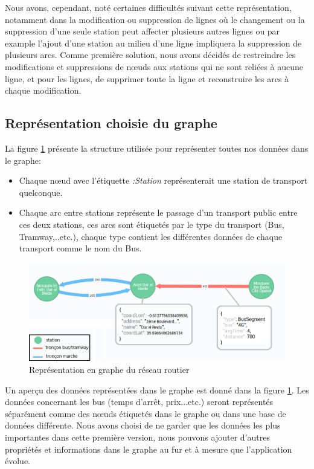 \begin{itemize}
	Nous avons, cependant, noté certaines difficultés suivant cette représentation, notamment dans la modification ou suppression de lignes où le changement ou la suppression d'une seule station peut affecter plusieurs autres lignes ou par example l'ajout d'une station au milieu d'une ligne impliquera la suppression de plusieurs arcs.
	Comme première solution, nous avons décidés de restreindre les modifications et suppressions de nœuds aux stations qui ne sont reliées à aucune ligne, et pour les lignes, de supprimer toute la ligne et reconstruire les arcs à chaque modification.
	     
\end{itemize}
\subsection{Représentation choisie du graphe}
La figure \ref{fig:structGraph} présente la structure utilisée pour représenter toutes nos données dans le graphe:
\begin{itemize}
	\item Chaque nœud avec l'étiquette \emph{:Station} représenterait une station de transport quelconque.
	\item Chaque arc entre stations représente le passage d'un transport public entre ces deux stations, ces arcs sont étiquetés par le type du transport (Bus, Tramway,..etc.), chaque type contient les différentes données de chaque transport comme le nom du Bus.
\end{itemize}

\begin{figure}[h!]
	\center
	\includegraphics[width=\textwidth]{img/structureGraphe.png}
	\caption{Représentation en graphe du réseau routier}
	\label{fig:structGraph}
\end{figure}

Un aperçu des données représentées dans le graphe est donné dans la figure \ref{fig:structGraph}. Les données concernant les bus (temps d'arrêt, prix...etc.) seront représentés séparément comme des nœuds étiquetés dans le graphe ou dans une base de données différente. \newline
Nous avons choisi de ne garder que les données les plus importantes dans cette première version, nous pouvons ajouter d'autres propriétés et informations dans le graphe au fur et à mesure que l'application évolue.

